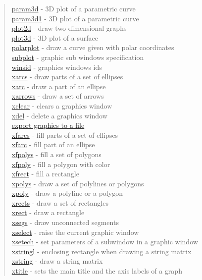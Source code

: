\begin{quote}
\hyperlink{param3d}{param3d} - 3D plot of a parametric curve\\
\hyperlink{param3d1}{param3d1} - 3D plot of a parametric curve\\
\hyperlink{plot2d}{plot2d} - draw two dimensional graphs\\
\hyperlink{plot3d}{plot3d} - 3D plot of a surface \\
\hyperlink{polarplot}{polarplot} - draw a curve given with polar coordinates \\
\hyperlink{subplot}{subplot} - graphic sub windows specification\\
\hyperlink{winsid}{winsid} - graphics windows ids\\
\hyperlink{xarcs}{xarcs} - draw parts of a set of ellipses \\
\hyperlink{xarc}{xarc} - draw a part of an ellipse\\
\hyperlink{xarrows}{xarrows} - draw a set of arrows \\
\hyperlink{xclear}{xclear} - clears a graphics window \\
\hyperlink{xdel}{xdel} - delete a graphics window \\
\hyperlink{xexport}{export graphics to a file}\\
\hyperlink{xfarcs}{xfarcs} - fill parts of a set of ellipses \\
\hyperlink{xfarc}{xfarc} - fill part of an ellipse\\
\hyperlink{xfpolys}{xfpolys} - fill a set of polygons \\
\hyperlink{xfpoly}{xfpoly} - fill a polygon with color \\
\hyperlink{xfrect}{xfrect} - fill a rectangle \\
\hyperlink{xpolys}{xpolys} - draw a set of polylines or polygons \\
\hyperlink{xpoly}{xpoly} - draw a polyline or a polygon \\
\hyperlink{xrects}{xrects} - draw a set of rectangles\\
\hyperlink{xrect}{xrect} - draw a rectangle\\
\hyperlink{xsegs}{xsegs} - draw unconnected segments \\
\hyperlink{xselect}{xselect} - raise the current graphic window\\
\hyperlink{xsetech}{xsetech} - set parameters of a subwindow in a graphic window\\
\hyperlink{xstringl}{xstringl} - enclosing rectangle when drawing a string matrix \\
\hyperlink{xstring}{xstring} - draw a string matrix \\
\hyperlink{xtitle}{xtitle} - sets the main title and the axis labels of a graph\\
\end{quote}

